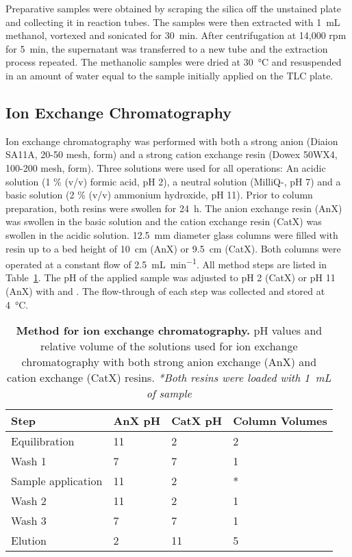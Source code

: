 	Preparative samples were obtained by scraping the silica off the unstained plate and collecting it in reaction tubes. The samples were then extracted with \SI{1}{\milli\liter} methanol, vortexed and sonicated for \SI{30}{\minute}. After centrifugation at 14,000 rpm for \SI{5}{\minute}, the supernatant was transferred to a new tube and the extraction process repeated. The methanolic samples were dried at \SI{30}{\celsius} and resuspended in an amount of water equal to the sample initially applied on the TLC plate.

	\subsection{Ion Exchange Chromatography} %
	\label{sub:ion_exchange_chromatography}

	Ion exchange chromatography was performed with both a strong anion (Diaion SA11A, 20-50 mesh,  form) and a strong cation exchange resin (Dowex 50WX4, 100-200 mesh,  form). Three solutions were used for all operations: An acidic solution (1 \% (v/v) formic acid, pH 2), a neutral solution (MilliQ-, pH 7) and a basic solution (2 \% (v/v) ammonium hydroxide, pH 11).
	Prior to column preparation, both resins were swollen for \SI{24}{\hour}. The anion exchange resin (AnX) was swollen in the basic solution and the cation exchange resin (CatX) was swollen in the acidic solution. \SI{12.5}{\milli\meter} diameter glass columns were filled with resin up to a bed height of \SI{10}{\centi\meter} (AnX) or \SI{9.5}{\centi\meter} (CatX).
	Both columns were operated at a constant flow of \SI{2.5}{\milli\liter\per\minute}. All method steps are listed in Table~\ref{tab:ion_exchange_tab}. The pH of the applied sample was adjusted to pH 2 (CatX) or pH 11 (AnX) with  and . The flow-through of each step was collected and stored at \SI{4}{\celsius}. 

	\begin{table}[htbp]
		\caption[Method for ion exchange chromatography]{\textbf{Method for ion exchange chromatography.} pH values and relative volume of the solutions used for ion exchange chromatography with both strong anion exchange (AnX) and cation exchange (CatX) resins. \emph{*Both resins were loaded with \SI{1}{\milli\liter} of sample}}
		\label{tab:ion_exchange_tab}
		\centering
		\begin{tabularx}{\textwidth}{XXXX}
			\toprule
			\textbf{Step} 			& \textbf{AnX pH}	& \textbf{CatX pH} 	& \textbf{Column Volumes} 	\\
			\midrule
			Equilibration 	 		& 11 				& 2 				& 2		\\
			Wash 1 					& 7 				& 7 				& 1 	\\
			Sample application 		& 11 				& 2 				& *		\\
			Wash 2  				& 11 				& 2 				& 1 	\\
			Wash 3 					& 7					& 7 				& 1 	\\
			Elution 				& 2 				& 11 				& 5 	\\
			\bottomrule
		\end{tabularx}
	\end{table}

